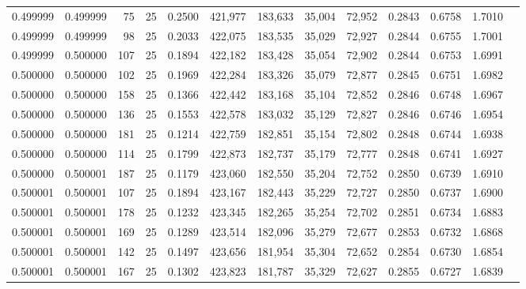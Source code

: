 \begin{tabular}{rrrrrrrrrrrrr}
0.499999 & 0.499999 &    75 &  25 &                                     0.2500 & 421,977 & 183,633 &  35,004 &  72,952 & 0.2843 & 0.6758 & 1.7010 \\
0.499999 & 0.499999 &    98 &  25 &                                     0.2033 & 422,075 & 183,535 &  35,029 &  72,927 & 0.2844 & 0.6755 & 1.7001 \\
0.499999 & 0.500000 &   107 &  25 &                                     0.1894 & 422,182 & 183,428 &  35,054 &  72,902 & 0.2844 & 0.6753 & 1.6991 \\
0.500000 & 0.500000 &   102 &  25 &                                     0.1969 & 422,284 & 183,326 &  35,079 &  72,877 & 0.2845 & 0.6751 & 1.6982 \\
0.500000 & 0.500000 &   158 &  25 &                                     0.1366 & 422,442 & 183,168 &  35,104 &  72,852 & 0.2846 & 0.6748 & 1.6967 \\
0.500000 & 0.500000 &   136 &  25 &                                     0.1553 & 422,578 & 183,032 &  35,129 &  72,827 & 0.2846 & 0.6746 & 1.6954 \\
0.500000 & 0.500000 &   181 &  25 &                                     0.1214 & 422,759 & 182,851 &  35,154 &  72,802 & 0.2848 & 0.6744 & 1.6938 \\
0.500000 & 0.500000 &   114 &  25 &                                     0.1799 & 422,873 & 182,737 &  35,179 &  72,777 & 0.2848 & 0.6741 & 1.6927 \\
0.500000 & 0.500001 &   187 &  25 &                                     0.1179 & 423,060 & 182,550 &  35,204 &  72,752 & 0.2850 & 0.6739 & 1.6910 \\
0.500001 & 0.500001 &   107 &  25 &                                     0.1894 & 423,167 & 182,443 &  35,229 &  72,727 & 0.2850 & 0.6737 & 1.6900 \\
0.500001 & 0.500001 &   178 &  25 &                                     0.1232 & 423,345 & 182,265 &  35,254 &  72,702 & 0.2851 & 0.6734 & 1.6883 \\
0.500001 & 0.500001 &   169 &  25 &                                     0.1289 & 423,514 & 182,096 &  35,279 &  72,677 & 0.2853 & 0.6732 & 1.6868 \\
0.500001 & 0.500001 &   142 &  25 &                                     0.1497 & 423,656 & 181,954 &  35,304 &  72,652 & 0.2854 & 0.6730 & 1.6854 \\
0.500001 & 0.500001 &   167 &  25 &                                     0.1302 & 423,823 & 181,787 &  35,329 &  72,627 & 0.2855 & 0.6727 & 1.6839 \\

\end{tabular}
